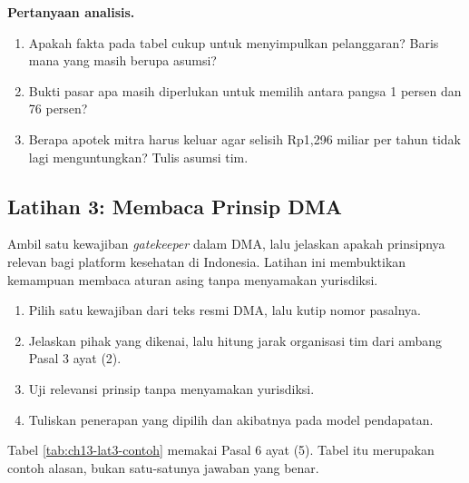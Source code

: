 \textbf{Pertanyaan analisis.}
\begin{enumerate}
  \item Apakah fakta pada tabel cukup untuk menyimpulkan pelanggaran? Baris mana yang masih berupa asumsi?
  \item Bukti pasar apa masih diperlukan untuk memilih antara pangsa 1 persen dan 76 persen?
  \item Berapa apotek mitra harus keluar agar selisih Rp1,296 miliar per tahun tidak lagi menguntungkan? Tulis asumsi tim.
\end{enumerate}

\subsection*{Latihan 3: Membaca Prinsip DMA}

Ambil satu kewajiban \textit{gatekeeper} dalam DMA, lalu jelaskan apakah prinsipnya relevan bagi platform kesehatan di Indonesia. Latihan ini membuktikan kemampuan membaca aturan asing tanpa menyamakan yurisdiksi.

\begin{enumerate}
  \item Pilih satu kewajiban dari teks resmi DMA, lalu kutip nomor pasalnya.
  \item Jelaskan pihak yang dikenai, lalu hitung jarak organisasi tim dari ambang Pasal 3 ayat (2).
  \item Uji relevansi prinsip tanpa menyamakan yurisdiksi.
  \item Tuliskan penerapan yang dipilih dan akibatnya pada model pendapatan.
\end{enumerate}

Tabel \ref{tab:ch13-lat3-contoh} memakai Pasal 6 ayat (5). Tabel itu merupakan contoh alasan, bukan satu-satunya jawaban yang benar.

